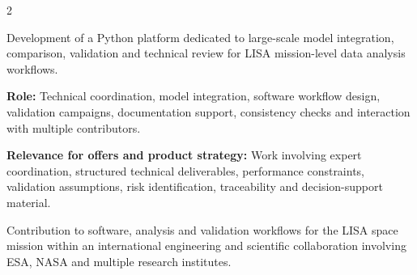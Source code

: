 \documentclass[8pt,a4paper,ragged2e,withhyper]{altacv}
\begin{document}
\begin{paracol}{2}

\divider
{}
\divider

\medskip



\divider


\divider


\divider




\end{paracol}



Development of a Python platform dedicated to large-scale model integration, comparison, validation and technical review for LISA mission-level data analysis workflows.

\textbf{Role:} Technical coordination, model integration, software workflow design, validation campaigns, documentation support, consistency checks and interaction with multiple contributors.

\textbf{Relevance for offers and product strategy:} Work involving expert coordination, structured technical deliverables, performance constraints, validation assumptions, risk identification, traceability and decision-support material.

\divider


Contribution to software, analysis and validation workflows for the LISA space mission within an international engineering and scientific collaboration involving ESA, NASA and multiple research institutes.
\end{document}
